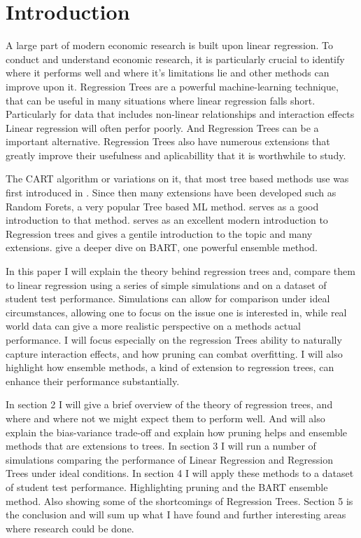 \documentclass[12pt]{article}
\begin{document}



\tableofcontents


\section{Introduction}

A large part of modern economic research is built upon linear regression. To conduct and understand economic research, it is particularly crucial to identify where it performs well and where it's limitations lie and other methods can improve upon it. Regression Trees are a powerful machine-learning technique, that can be useful in many situations where linear regression falls short. Particularly for data that includes non-linear relationships and interaction effects Linear regression will often perfor poorly. And Regression Trees can be a important alternative. Regression Trees also have numerous extensions that greatly improve their usefulness and aplicabillity that it is worthwhile to study.

The CART algorithm or variations on it, that most tree based methods use was first introduced in \citep{breiman1984}. Since then many extensions have been developed such as Random Forets, a very popular Tree based ML method. \citep{biau2016} serves as a good introduction to that method. \citep{hastie2021} serves as an excellent modern introduction to Regression trees and gives a gentile introduction to the topic and many extensions. \citep{tan2019} give a deeper dive on BART, one powerful ensemble method.

In this paper I will explain the theory behind regression trees and, compare them to linear regression using a series of simple simulations and on a dataset of student test performance. Simulations can allow for comparison under ideal circumstances, allowing one to focus on the issue one is interested in, while real world data can give a more realistic perspective on a methods actual performance. I will focus especially on the regression Trees ability to naturally capture interaction effects, and how pruning can combat overfitting. I will also highlight how ensemble methods, a kind of extension to regression trees, can enhance their performance substantially.

In section 2 I will give a brief overview of the theory of regression trees, and where and where not we might expect them to perform well. And will also explain the bias-variance trade-off and explain how pruning helps and ensemble methods that are extensions to trees. In section 3 I will run a number of simulations comparing the performance of Linear Regression and Regression Trees under ideal conditions. In section 4 I will apply these methods to a dataset of student test performance. Highlighting pruning and the BART ensemble method. Also showing some of the shortcomings of Regression Trees. Section 5 is the conclusion and will sum up what I have found and further interesting areas where research could be done.
\end{document}

